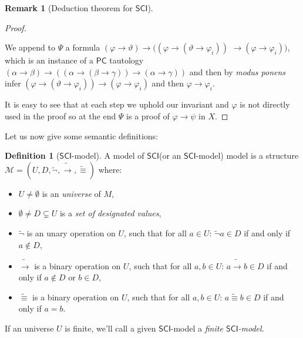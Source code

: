 \documentclass{article}
\theoremstyle{definition}
\newtheorem{definition}{Definition}[section]
\theoremstyle{definition}
\theoremstyle{definition}
\newtheorem{remark}{Remark}[section]
\newcommand*{\id}{\equiv}
\newcommand*{\ra}{\rightarrow}
\newcommand{\SCI}{$\mathsf{SCI}$\xspace}
\newcommand{\PC}{$\mathsf{PC}$\xspace}
\begin{document}
\begin{remark}[Deduction theorem for \SCI]
\begin{proof}
\begin{itemize}
                  We append to $\Psi$ a formula $(\varphi \ra \vartheta) \ra( (\varphi \ra
                      (\vartheta \ra \varphi_i))$ $ \ra (\varphi \ra \varphi_i) )$, which is an
                  instance of a \PC tautology $(\alpha \ra \beta) \ra ( (\alpha \ra (\beta \ra
                      \gamma)) \ra (\alpha \ra \gamma) )$ and then by \emph{modus ponens} infer
                  $(\varphi \ra (\vartheta \ra \varphi_i)) \ra (\varphi \ra \varphi_i)$ and then
                  $\varphi \ra \varphi_i$.
        \end{itemize}

        It is easy to see that at each step we uphold our invariant and $\varphi$ is
        not directly used in the proof so at the end $\Psi$ is a proof of $\varphi \ra
            \psi$ in $X$.

    \end{proof}
\end{remark}
%
Let us now give some semantic definitions:

\begin{definition}[\SCI-model]
    A model of \SCI (or an \SCI-model) model is a structure $\mathcal{M} = (U, D, \tilde{\lnot}, \tilde{\ra}, \tilde{\id})$ where:
    \begin{itemize}
        \item $U \not = \emptyset$ is an \emph{universe} of $M$,
        \item $\emptyset \not = D \subsetneq U$ is a \emph{set of designated values},
        \item $\tilde{\lnot}$ is an unary operation on $U$, such that for all $a \in U$: $\tilde{\lnot}a \in D$ if and only if $a \not \in D$,
        \item $\tilde{\ra}$ is a binary operation on $U$, such that for all $a, b \in U$: $a \tilde{\ra} b \in D$ if and only if $a \not \in D$ or $b \in D$,
        \item $\tilde{\id}$ is a binary operation on $U$, such that for all $a, b \in U$: $a \tilde{\id} b \in D$ if and only if $a = b$.
    \end{itemize}
    \label{model}
\end{definition}
%
If an universe $U$ is finite, we'll call a given \SCI-model a \emph{finite
    \SCI-model}.
\end{document}
